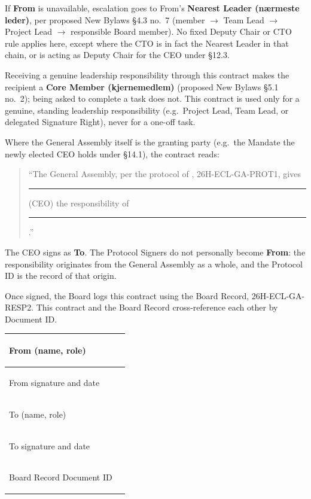 \documentclass{../../../Common/Latex/Templates/rapport}
\begin{document}
If \textbf{From} is unavailable, escalation goes to From's \textbf{Nearest Leader (nærmeste leder)}, per proposed New Bylaws \S4.3 no.\ 7 (member \(\to\) Team Lead \(\to\) Project Lead \(\to\) responsible Board member). No fixed Deputy Chair or CTO rule applies here, except where the CTO is in fact the Nearest Leader in that chain, or is acting as Deputy Chair for the CEO under \S12.3.

Receiving a genuine leadership responsibility through this contract makes the recipient a \textbf{Core Member (kjernemedlem)} (proposed New Bylaws \S5.1 no.\ 2); being asked to complete a task does not. This contract is used only for a genuine, standing leadership responsibility (e.g.\ Project Lead, Team Lead, or delegated Signature Right), never for a one-off task.

Where the General Assembly itself is the granting party (e.g.\ the Mandate the newly elected CEO holds under \S14.1), the contract reads:

\begin{quote}
  ``The General Assembly, per the protocol of \meetingdate, 26H-ECL-GA-PROT1, gives \rule{3.5cm}{0.4pt} (CEO) the responsibility of \rule{4cm}{0.4pt}.''
\end{quote}

The CEO signs as \textbf{To}. The Protocol Signers do not personally become \textbf{From}: the responsibility originates from the General Assembly as a whole, and the Protocol ID is the record of that origin.

Once signed, the Board logs this contract using the Board Record, 26H-ECL-GA-RESP2. This contract and the Board Record cross-reference each other by Document ID.

\begin{tabularx}{\textwidth}{|>{\bfseries\raggedright\arraybackslash}p{4cm}|X|}
  \hline
  From (name, role)        & \rule{0pt}{1.2cm} \\
  \hline
  From signature and date  & \rule{0pt}{1.2cm} \\
  \hline
  To (name, role)          & \rule{0pt}{1.2cm} \\
  \hline
  To signature and date    & \rule{0pt}{1.2cm} \\
  \hline
  Board Record Document ID & \rule{0pt}{1cm}   \\
  \hline
\end{tabularx}
\end{document}
